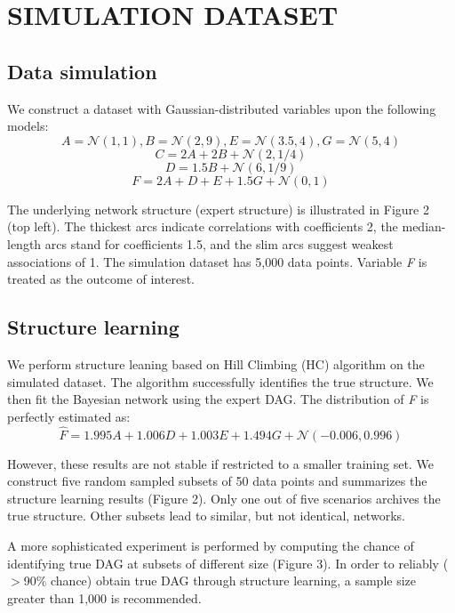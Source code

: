 \documentclass{article}
\begin{document}
\section{SIMULATION DATASET}

\subsection{Data simulation}
We construct a dataset with Gaussian-distributed variables upon the following models:
\vspace{-0.5em}
\[A=\mathcal{N}(1,1), B=\mathcal{N}(2,9), E=\mathcal{N}(3.5,4), G=\mathcal{N}(5,4)\]
\vspace{-2em}
\[C=2A+2B+\mathcal{N}(2, 1/4)\] 
\vspace{-1.5em}
\[D=1.5B+\mathcal{N}(6, 1/9)\] 
\vspace{-1.5em}
\[F=2A+D+E+1.5G+\mathcal{N}(0, 1)\] \par

The underlying network structure (expert structure) is illustrated in Figure 2 (top left). The thickest arcs indicate correlations with coefficients 2, the median-length arcs stand for coefficients 1.5, and the slim arcs suggest weakest associations of 1. The simulation dataset has 5,000 data points. Variable \textit{F} is treated as the outcome of interest. \par


\subsection{Structure learning }
We perform structure leaning based on Hill Climbing (HC) algorithm on the simulated dataset. The algorithm successfully identifies the true structure. We then fit the Bayesian network using the expert DAG. The distribution of \textit{F} is perfectly estimated as: 
\vspace{-0.5em}
\[ \hat{F}=1.995A+1.006D+1.003E+1.494G+\mathcal{N}(-0.006, 0.996)  \]  \par

However, these results are not stable if restricted to a smaller training set. We construct five random sampled subsets of 50 data points and summarizes the structure learning results (Figure 2). Only one out of five scenarios archives the true structure. Other subsets lead to similar, but not identical, networks. \par

A more sophisticated experiment is performed by computing the chance of identifying true DAG at subsets of different size (Figure 3). In order to reliably ($>$90$\%$ chance) obtain true DAG through structure learning, a sample size greater than 1,000 is recommended. \par
\end{document}
